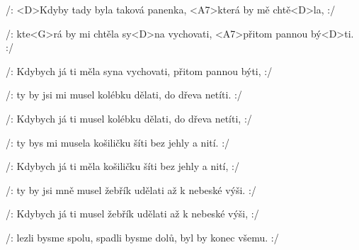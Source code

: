 

\zs
/: <D>Kdyby tady byla taková panenka,
<A7>která by mě chtě<D>la, :/

/: kte<G>rá by mi chtěla sy<D>na vychovati,
<A7>přitom pannou bý<D>ti. :/
\ks

\zs
/: Kdybych já ti měla syna vychovati, přitom pannou býti, :/

/: ty by jsi mi musel kolébku dělati, do dřeva netíti. :/
\ks

\zs
/: Kdybych já ti musel kolébku dělati, do dřeva netíti, :/

/: ty bys mi musela košiličku šíti bez jehly a nití. :/
\ks

\zs
/: Kdybych já ti měla košiličku šíti bez jehly a nití, :/

/: ty by jsi mně musel žebřík udělati až k nebeské výši. :/
\ks

\zs
/: Kdybych já ti musel žebřík udělati až k nebeské výši, :/

/: lezli bysme spolu, spadli bysme dolů, byl by konec všemu. :/
\ks

\kp























